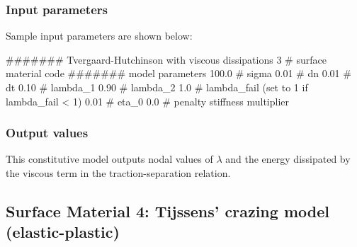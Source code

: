 \subsubsection{Input parameters}
Sample input parameters are shown below:
\begin{inputfile}
####### Tvergaard-Hutchinson with viscous dissipations
3     # surface material code
####### model parameters
100.0 # sigma
0.01  # dn
0.01  # dt
0.10  # lambda_1
0.90  # lambda_2
1.0   # lambda_fail (set to 1 if lambda_fail < 1)
0.01  # eta_0
0.0   # penalty stiffness multiplier
\end{inputfile}

\subsubsection{Output values}
This constitutive model outputs nodal values of $\lambda$ and the energy dissipated
by the viscous term in the traction-separation relation.

\subsection{Surface Material 4: Tijssens' crazing model (elastic-plastic)}
\label{sect.material.surface.tij}

